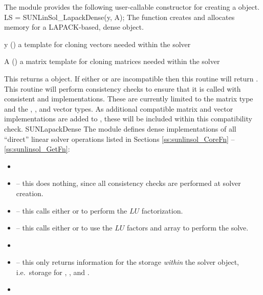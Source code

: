 The {\sunlinsollapdense} module provides the following user-callable constructor
for creating a \newline {} object.
%
%
{
  LS = SUNLinSol\_LapackDense(y, A);
}
{
  The function  creates and allocates memory for
  a LAPACK-based, dense  object.
}
{
  \begin{args}[y]
  \item[y] ()
    a template for cloning vectors needed within the solver
  \item[A] ()
    a {\sunmatdense} matrix template for cloning matrices needed
    within the solver
  \end{args}
}
{
  This returns a  object.  If either  or
   are incompatible then this routine will return .
}
{
  This routine will perform consistency checks to ensure that it is
  called with consistent {\nvector} and {\sunmatrix} implementations.
  These are currently limited to the {\sunmatdense} matrix type and
  the {\nvecs}, {\nvecopenmp}, and {\nvecpthreads} vector types.  As
  additional compatible matrix and vector implementations are added to
  {\sundials}, these will be included within this compatibility check.
}
{SUNLapackDense}
%
%
The {\sunlinsollapdense} module defines dense implementations of all
``direct'' linear solver operations listed in Sections
\ref{ss:sunlinsol_CoreFn} -- \ref{ss:sunlinsol_GetFn}:
\begin{itemize}
\item {}
\item {} -- this does nothing, since all
  consistency checks are performed at solver creation.
\item {} -- this calls either
   or  to perform the $LU$ factorization.
\item {} -- this calls either
   or  to use the $LU$ factors and 
  array to perform the solve.
\item {}
\item {} -- this only returns information for
  the storage \emph{within} the solver object, i.e.~storage
  for , , and .
\item {}
\end{itemize}


